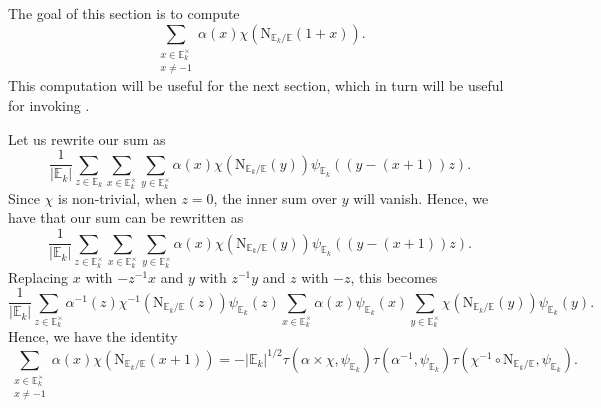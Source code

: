 \documentclass[12pt, reqno]{amsart}
\theoremstyle{definition}
\theoremstyle{definition}
\theoremstyle{definition}
\newcommand{\multiplicativegroup}[1]{#1^{\times}}
\newcommand{\sizeof}[1]{\left|#1\right|}
\newcommand{\fieldCharacter}{\psi}
\newcommand{\aFieldNorm}{\mathrm{N}}
\newcommand{\quadraticExtension}{\mathbb{E}}
\newcommand{\quadraticFieldExtension}[1]{\quadraticExtension_{#1}}
\newcommand{\GaussSumSingleCharacter}[2]{\tau\left(#1, #2\right)}
\newcommand{\GaussSumCharacter}[3]{\tau\left(#1 \times #2, #3\right)}
\begin{document}
The goal of this section is to compute $$\sum_{\substack{x \in \multiplicativegroup{\quadraticFieldExtension{k}}\\
x \ne -1}} \alpha\left(x\right) \chi\left(\aFieldNorm_{\quadraticFieldExtension{k} \slash \quadraticExtension}\left(1+x\right)\right).$$
This computation will be useful for the next section, which in turn will be useful for invoking .

Let us rewrite our sum as
$$\frac{1}{\sizeof{\quadraticFieldExtension{k}}} \sum_{z \in \quadraticFieldExtension{k}} \sum_{x \in  \multiplicativegroup{\quadraticFieldExtension{k}}} \sum_{y \in \multiplicativegroup{\quadraticFieldExtension{k}}}\alpha\left(x\right) \chi\left(\aFieldNorm_{\quadraticFieldExtension{k} \slash \quadraticExtension}\left(y\right)\right) \fieldCharacter_{\quadraticFieldExtension{k}}\left(\left(y - \left(x + 1\right)\right)z\right).$$
Since $\chi$ is non-trivial, when $z = 0$, the inner sum over $y$ will vanish. Hence, we have that our sum can be rewritten as
$$\frac{1}{\sizeof{\quadraticFieldExtension{k}}} \sum_{z \in \multiplicativegroup{\quadraticFieldExtension{k}}} \sum_{x \in  \multiplicativegroup{\quadraticFieldExtension{k}}} \sum_{y \in \multiplicativegroup{\quadraticFieldExtension{k}}}\alpha\left(x\right) \chi\left(\aFieldNorm_{\quadraticFieldExtension{k} \slash \quadraticExtension}\left(y\right)\right) \fieldCharacter_{\quadraticFieldExtension{k}}\left(\left(y - \left(x + 1\right)\right)z\right).$$
Replacing $x$ with $-z^{-1} x$ and $y$ with $z^{-1} y$ and $z$ with $-z$, this becomes
$$\frac{1}{\sizeof{\quadraticFieldExtension{k}}} \sum_{z \in \multiplicativegroup{\quadraticFieldExtension{k}}} \alpha^{-1}\left(z\right) \chi^{-1}\left(\aFieldNorm_{\quadraticFieldExtension{k} \slash \quadraticExtension}\left(z\right)\right) \fieldCharacter_{\quadraticFieldExtension{k}}\left(z\right) \sum_{x \in  \multiplicativegroup{\quadraticFieldExtension{k}}} \alpha\left(x\right) \fieldCharacter_{\quadraticFieldExtension{k}}\left(x\right) \sum_{y \in \multiplicativegroup{\quadraticFieldExtension{k}}} \chi\left(\aFieldNorm_{\quadraticFieldExtension{k} \slash \quadraticExtension}\left(y\right)\right) \fieldCharacter_{\quadraticFieldExtension{k}}\left(y\right).$$
Hence, we have the identity
$$\sum_{\substack{x \in \multiplicativegroup{\quadraticFieldExtension{k}}\\
x \ne -1}} \alpha\left(x\right) \chi\left(\aFieldNorm_{\quadraticFieldExtension{k} \slash \quadraticExtension}\left(x+1\right)\right) = -\sizeof{\quadraticFieldExtension{k}}^{1/2} \GaussSumCharacter{\alpha}{\chi}{\fieldCharacter_{\quadraticFieldExtension{k}}} \GaussSumSingleCharacter{\alpha^{-1}} {\fieldCharacter_{\quadraticFieldExtension{k}}} \GaussSumSingleCharacter{\chi^{-1} \circ \aFieldNorm_{\quadraticFieldExtension{k} \slash \quadraticExtension}}{\fieldCharacter_{\quadraticFieldExtension{k}}}.$$
\end{document}
